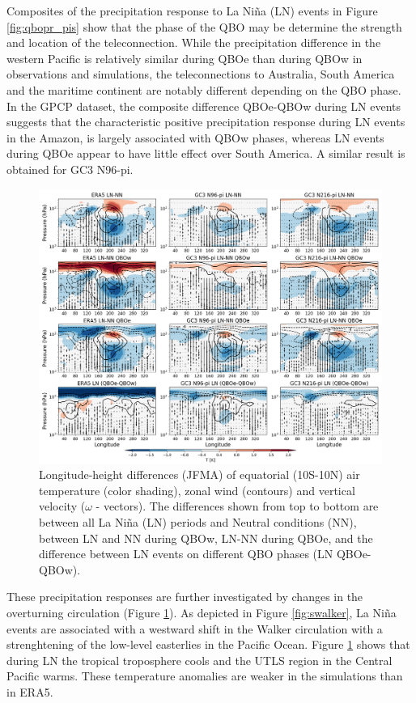 Composites of the precipitation response to La Niña (LN) events in Figure \ref{fig:qbopr_pis} show that the phase of the QBO may be determine the strength and location of the teleconnection. 
While the precipitation difference in the western Pacific is relatively similar during QBOe than during QBOw in observations and simulations, the teleconnections to Australia, South America and the maritime continent are notably different depending on the QBO phase. 
In the GPCP dataset, the composite difference QBOe-QBOw during LN events suggests that the characteristic positive precipitation response during LN events in the Amazon, is largely associated with QBOw phases, whereas LN events during QBOe appear to have little effect over South America. 
A similar result is obtained for GC3 N96-pi. 


\begin{figure}[t!]
\includegraphics[width=\linewidth]{figures/walker_wqbo_jfma}
\caption[Walker circulation responses to La Niña under different QBO phases] {Longitude-height differences (JFMA) of equatorial (10S-10N) air temperature (color shading), zonal wind (contours) and vertical velocity ($\omega$ - vectors). The differences shown from top to bottom are between all La Niña (LN) periods and Neutral conditions (NN), between LN and NN during QBOw, LN-NN during QBOe, and the difference between LN events on different QBO phases (LN QBOe-QBOw). 
}
\label{fig:qbowalker_pis}
\end{figure}

These precipitation responses are further investigated by changes in the overturning circulation (Figure \ref{fig:qbowalker_pis}). As depicted in Figure \ref{fig:swalker}, La Niña events are associated with a westward shift in the Walker circulation with a strenghtening of the low-level easterlies in the Pacific Ocean. 
Figure \ref{fig:qbowalker_pis} shows that during LN the tropical troposphere cools and the UTLS region in the Central Pacific warms. These temperature anomalies are weaker in the simulations than in ERA5. 


